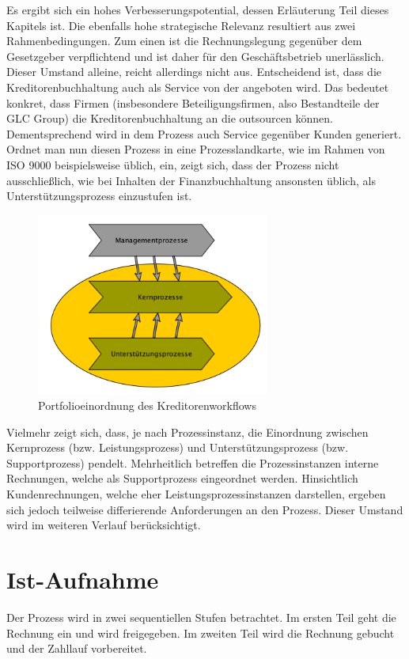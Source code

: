 Es ergibt sich ein hohes Verbesserungspotential, dessen Erläuterung Teil dieses Kapitels ist.
Die ebenfalls hohe strategische Relevanz resultiert aus zwei Rahmenbedingungen. 
Zum einen ist die Rechnungslegung gegenüber dem Gesetzgeber verpflichtend und ist daher für den Geschäftsbetrieb unerlässlich. Dieser Umstand alleine, reicht allerdings nicht aus. 
Entscheidend ist, dass die Kreditorenbuchhaltung auch als Service von der \firma angeboten wird.
Das bedeutet konkret, dass Firmen (insbesondere Beteiligungsfirmen, also Bestandteile der GLC Group) die Kreditorenbuchhaltung an die \firma outsourcen können. 
Dementsprechend wird in dem Prozess auch Service gegenüber Kunden generiert.\\
Ordnet man nun diesen Prozess in eine Prozesslandkarte, wie im Rahmen von ISO 9000 beispielsweise üblich, ein, zeigt sich, dass der Prozess nicht ausschließlich, wie bei Inhalten der Finanzbuchhaltung ansonsten üblich, als Unterstützungsprozess einzustufen ist.


\begin{figure}[!htb]
\centering
\includegraphics[height=60mm]{images/prozesslandkarte}
\caption{Portfolioeinordnung des Kreditorenworkflows}
\label{Portfolioeinordnung des Kreditorenworkflows}
\end{figure}


Vielmehr zeigt sich, dass, je nach Prozessinstanz, die Einordnung zwischen Kernprozess (bzw. Leistungsprozess) und Unterstützungsprozess (bzw. Supportprozess) pendelt. 
Mehrheitlich betreffen die Prozessinstanzen interne Rechnungen, welche als Supportprozess eingeordnet werden. 
Hinsichtlich Kundenrechnungen, welche eher Leistungsprozessinstanzen darstellen, ergeben sich jedoch teilweise differierende Anforderungen an den Prozess.
Dieser Umstand wird im weiteren Verlauf berücksichtigt.


\section{Ist-Aufnahme}
Der Prozess wird in zwei sequentiellen Stufen betrachtet. 
Im ersten Teil geht die Rechnung  ein und wird freigegeben.
Im zweiten Teil wird die Rechnung gebucht und der Zahllauf vorbereitet.
